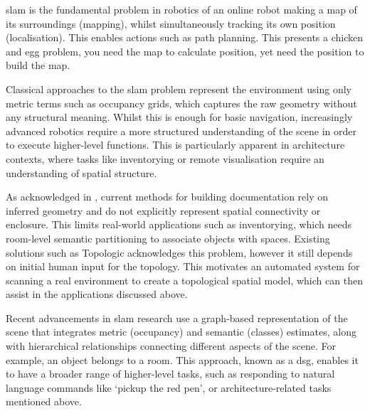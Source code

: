 
\gls{slam} is the fundamental problem in robotics of an online robot making a map of its surroundings (mapping), whilst simultaneously tracking its own position (localisation). This enables actions such as path planning. This presents a chicken and egg problem, you need the map to calculate position, yet need the position to build the map.

Classical approaches to the \gls{slam} problem represent the environment using only metric terms such as occupancy grids, which captures the raw geometry without any structural meaning. Whilst this is enough for basic navigation, increasingly advanced robotics require a more structured understanding of the scene in order to execute higher-level functions. This is particularly apparent in architecture contexts, where tasks like inventorying or remote visualisation require an understanding of spatial structure.

As acknowledged in \cite{topologic}, current methods for building documentation rely on  inferred geometry and do not explicitly represent spatial connectivity or enclosure. This limits real-world applications such as inventorying, which needs room-level semantic partitioning to associate objects with spaces. Existing solutions such as Topologic \cite{Jabi2025} acknowledges this problem, however it still depends on initial human input for the topology. This motivates an automated system for scanning a real environment to create a topological spatial model, which can then assist in the applications discussed above.

Recent advancements in \gls{slam} research use a graph-based representation of the scene that integrates metric (occupancy) and semantic (classes) estimates, along with hierarchical relationships connecting different aspects of the scene. For example, an object belongs to a room. This approach, known as a \gls{dsg}, enables it to have a broader range of higher-level tasks, such as responding to natural language commands like ‘pickup the red pen’, or architecture-related tasks mentioned above.

